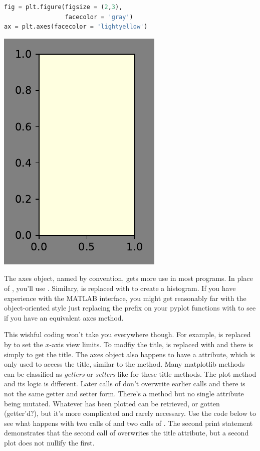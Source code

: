 \begin{lstlisting}[language = Python, caption = {[figparams.py]}]
fig = plt.figure(figsize = (2,3), 
                 facecolor = 'gray') 
ax = plt.axes(facecolor = 'lightyellow')
\end{lstlisting}

\begin{center}
    \includegraphics[width = .45\textwidth]{proseplots/figparams.pdf}
\end{center}


The axes object, named  by convention, gets more use in most programs. In place of , you'll use . Similary,  is replaced with  to create a histogram. If you have experience with the MATLAB interface, you might get reasonably far with the object-oriented style just replacing the  prefix on your pyplot functions with  to see if you have an equivalent axes method.

This wishful coding won't take you everywhere though. For example,  is replaced by  to set the $x$-axis view limits. To modfiy the title,  is replaced with  and there is  simply to get the title. The axes object also happens to have a  attribute, which is only used to access the title, similar to the  method. Many matplotlib methods can be classified as \emph{getters} or \emph{setters} like for these title methods. The plot method and its logic is different. Later calls of  don't overwrite earlier calls and there is not the same getter and setter form. There's a  method but no single  attribute being mutated. Whatever has been plotted can be retrieved, or gotten (getter'd?), but it's more complicated and rarely necessary. Use the code below to see what happens with two calls of  and two calls of . The second print statement demonstrates that the second call of  overwrites the title attribute, but a second plot does not nullify the first. 

